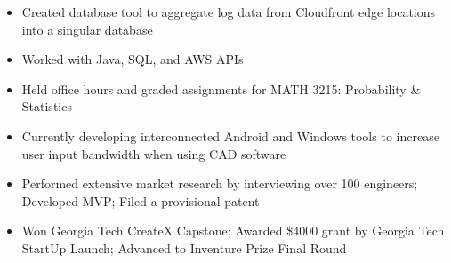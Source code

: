 \documentclass[10pt,letter,ragged2e,withhyper]{altacv}
\begin{document}
\begin{paracol}{2}




\begin{itemize}
\item Created database tool to aggregate log data from Cloudfront edge locations into a singular database
\item Worked with Java, SQL, and AWS APIs
\end{itemize}

\divider

\begin{itemize}
\item Held office hours and graded assignments for MATH 3215: Probability \& Statistics
\end{itemize}




\begin{itemize}
\item Currently developing interconnected Android and Windows tools to increase user input bandwidth when using CAD software
\item Performed extensive market research by interviewing over 100 engineers; Developed MVP; Filed a provisional patent
\item Won Georgia Tech CreateX Capstone; Awarded \$4000 grant by Georgia Tech StartUp Launch; Advanced to Inventure Prize Final Round
\end{itemize}


\end{paracol}
\end{document}
